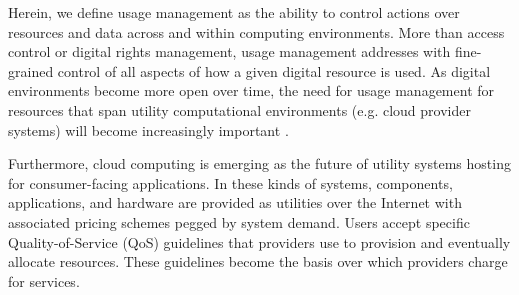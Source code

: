 \documentclass{acm_proc_article-sp}
\begin{document}
Herein, we define usage management as the ability to control actions over resources and data across and within computing environments.  More than access control or digital rights management, usage management addresses with fine-grained control of all aspects of how a given digital resource is used.  As digital environments become more open over time, the need for usage management for resources that span utility computational environments (e.g. cloud provider systems) will become increasingly important \cite{ctrl:lamb-MCCCS,ctrl:lamb-SOSE}.


Furthermore, cloud computing is emerging as the future of utility systems hosting for consumer-facing applications.  In these kinds of systems, components, applications, and hardware are provided as utilities over the Internet with associated pricing schemes pegged by system demand.  Users accept specific Quality-of-Service (QoS) guidelines that providers use to provision and eventually allocate resources. These guidelines become the basis over which providers charge for services.
\end{document}
